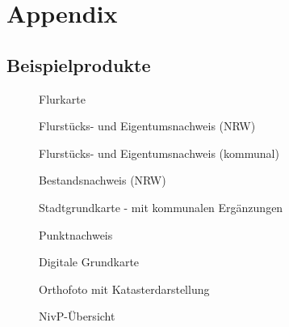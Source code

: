 \part*{Appendix}
\appendix
\chapter{Beispielprodukte}
\begin{figure}[htbp]
	\centering
	\caption{Flurkarte}
	\label{fig:flurkarte}
\end{figure}
\begin{figure}[htbp]
	\centering
	\caption{Flurstücks- und Eigentumsnachweis (NRW)}
	\label{fig:eigentumsnachweis_nrw}
\end{figure}
\begin{figure}[htbp]
	\centering
	\caption{Flurstücks- und Eigentumsnachweis (kommunal)}
	\label{fig:eigentumsnachweis_kom}
\end{figure}
\begin{figure}[htbp]
	\centering
	\caption{Bestandsnachweis (NRW)}
	\label{fig:bestandsnachweis_nrw}
\end{figure}
\begin{figure}[htbp]
	\centering
	\caption{Stadtgrundkarte - mit kommunalen Ergänzungen}
	\label{fig:stadtgrundkarte}
\end{figure}
\begin{figure}[htbp]
	\centering
	\caption{Punktnachweis}
	\label{fig:punktnachweis}
\end{figure}
\begin{figure}[htbp]
	\centering
	\caption{Digitale Grundkarte}
	\label{fig:digitale_grundkarte}
\end{figure}
\begin{figure}[htbp]
	\centering
	\caption{Orthofoto mit Katasterdarstellung}
	\label{fig:orthofoto-katasterdarstellung}
\end{figure}
\begin{figure}[htbp]
	\centering
	\caption{NivP-Übersicht}
	\label{fig:nivp-uebersicht}
\end{figure}
